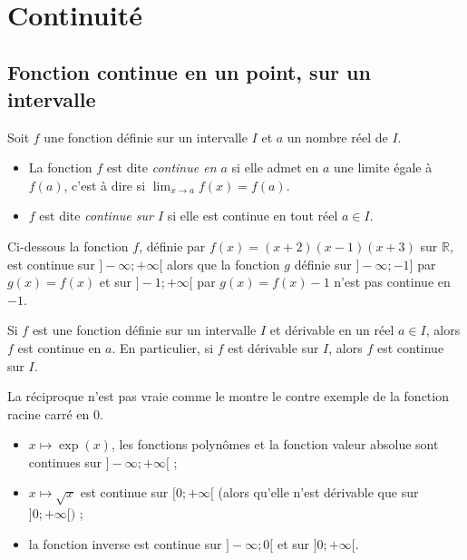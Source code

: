 \documentclass[french]{book}
\begin{document}
\tableofcontents
\
\chapter{Continuité}
\section{Fonction continue en un point, sur un intervalle}

\begin{defn}
 Soit $f$ une fonction définie sur un intervalle  $I$ et $a$ un nombre réel de $I$.
\begin{itemize}
 \item[$\bullet$] La fonction $f$ est dite \emph{continue en $a$} si elle admet en $a$ une limite égale à $f(a)$, c'est  à dire si $\lim_{x\rightarrow a}f(x)=f(a)$.
\item[$\bullet$] $f$ est dite \emph{continue sur $I$} si elle est continue en tout réel $a\in I$.
\end{itemize}
\end{defn}

\begin{exemple}
 Ci-dessous la fonction $f$, définie par $f(x)=(x+2)(x-1)(x+3)$ sur $\mathbb{R}$, est continue sur $]-\infty;+\infty[$ alors que la fonction $g$ définie sur $]-\infty;-1]$ par $g(x)=f(x)$ et sur $]-1;+\infty[$ par $g(x)=f(x)-1$ n'est pas continue en $-1$.
\end{exemple}


\begin{prop}
 Si $f$ est une fonction définie sur un intervalle $I$ et dérivable en un réel $a\in I$, alors $f$ est continue en $a$. En particulier, si $f$ est dérivable sur $I$, alors $f$ est continue sur $I$.
\end{prop}

\begin{rem}
 La réciproque n'est pas vraie comme le montre le contre exemple de la fonction racine carré en 0.
\end{rem}


\begin{prop}
\begin{itemize}
 \item[$\bullet$] $x\mapsto \exp(x)$, les fonctions polynômes et la fonction valeur absolue sont continues sur $]-\infty;+\infty[$ ;
\item[$\bullet$] $x\mapsto \sqrt{x}$ est continue sur $[0;+\infty[$ (alors qu'elle n'est dérivable que sur $]0;+\infty[)$ ;
\item[$\bullet$] la fonction inverse est continue sur $]-\infty;0[$ et sur $]0;+\infty[$.
\end{itemize}
\end{prop}
\end{document}
